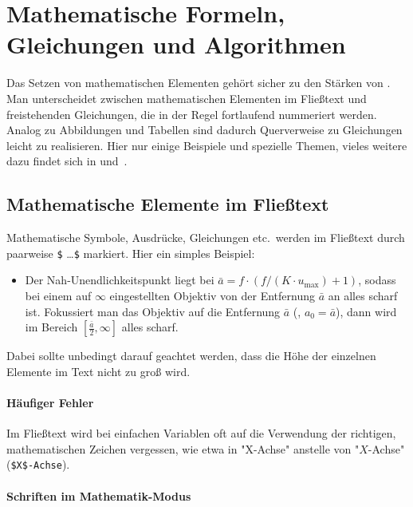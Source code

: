 \chapter[Mathem.\ Formeln etc.]{Mathematische Formeln, Gleichungen und Algorithmen}
\label{cha:Mathematik}

Das Setzen von mathematischen Elementen gehört sicher zu den Stär\-ken
von \latex. Man unterscheidet zwischen mathematischen Elementen im Fließtext
und freistehenden Gleichungen, die in der Regel fortlaufend nummeriert werden.
Analog zu Abbildungen und Tabellen sind dadurch Querverweise zu Gleichungen
leicht zu realisieren. Hier nur einige Beispiele und spezielle Themen, vieles
weitere dazu findet sich \zB in \cite[Kap.\ 7]{Kopka2003} und~\cite{Voss2014}.


\section{Mathematische Elemente im Fließtext}

Mathematische Symbole, Ausdrücke, Gleichungen etc.\ werden im Fließtext durch
paarweise \verb!$! \ldots \verb!$! markiert. Hier ein simples Beispiel:
%
\begin{itemize}
	\item[]
	Der Nah-Unendlichkeitspunkt liegt bei
	$\bar{a} = f \cdot (f / (K \cdot u_{\max}) + 1)$,
	sodass bei einem auf $\infty$ eingestellten Objektiv von der Entfernung
	$\bar{a}$ an alles scharf ist. Fokussiert man das Objektiv auf die
	Entfernung $\bar{a}$ (\dah, $a_0 = \bar{a}$), dann wird im Bereich
	$[\frac{\bar{a}}{2}, \infty]$ alles scharf.
\end{itemize}
%
Dabei sollte unbedingt darauf geachtet werden, dass die Höhe der einzelnen
Elemente im Text nicht zu groß wird.

\subsubsection{Häufiger Fehler}

Im Fließtext wird bei einfachen Variablen oft auf die Verwendung der richtigen,
mathematischen Zeichen vergessen, wie etwa in "X-Achse" anstelle von "$X$-Achse"
(\verb!$X$-Achse!).


\subsubsection{Schriften im Mathematik-Modus}

